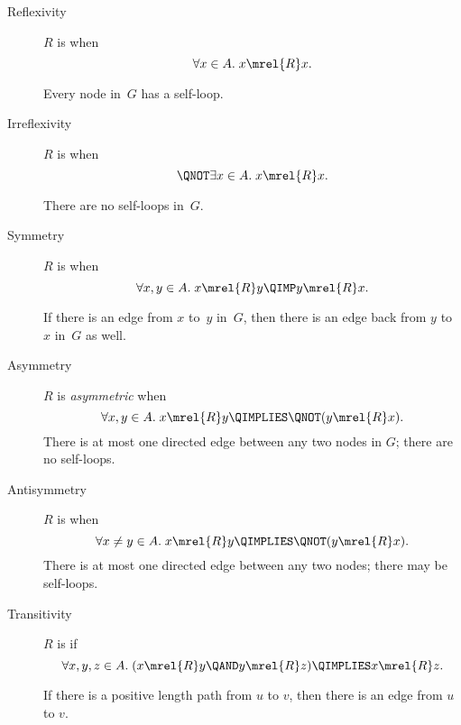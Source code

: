 \documentclass[handout]{mcs}
\begin{document}
\begin{pagesidebar}[to \textheight]

\begin{description}

\item[Reflexivity]

$R$ is  when
\[
\forall x \in A. \; x \mrel{R} x.
\]


Every node in~$G$ has a self-loop.

\item[Irreflexivity]

$R$ is  when
\[
\QNOT \exists x \in A. \; x \mrel{R} x.
\]


There are no self-loops in~$G$.

\item[Symmetry]

$R$ is  when
\[
\forall x, y \in A. \; x \mrel{R} y \QIMP y \mrel{R} x.
\]


If there is an edge from $x$ to~$y$ in~$G$, then there is an edge back from
$y$ to~$x$ in~$G$ as well.

\item[Asymmetry]
$R$ is \emph{asymmetric} when
\[
\forall x, y \in A. \; x \mrel{R} y \QIMPLIES \QNOT( y \mrel{R} x ).
\]
There is at most one directed edge between any two nodes in $G$; there
are no self-loops.

\item[Antisymmetry]
$R$ is  when
\[
\forall x \neq y \in A. \; x \mrel{R} y \QIMPLIES \QNOT( y \mrel{R} x ).
\]
There is at most one directed edge between any two nodes; there may be self-loops.

\item[Transitivity]
$R$ is  if
\[
 \forall x, y, z \in A. \; (x \mrel{R} y \QAND y \mrel{R} z) \QIMPLIES x \mrel{R} z.
\]

If there is a positive length path from $u$ to $v$, then there is an edge from $u$ to $v$.

\iffalse
For any walk $v_0, v_1, \dots, v_k$ in~$G$ where $k \ge 2$,
$\diredge{v_0}{v_k}$ is in~$G$ (and, hence, $\diredge{v_i}{v_j}$ is
also in~$G$ for all $i < j$.
\fi


\end{description}
\end{pagesidebar}
\end{document}
